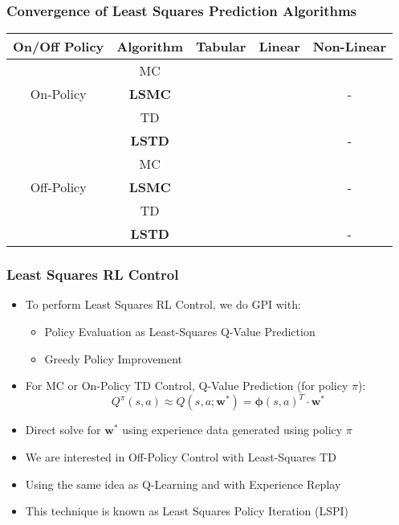 \documentclass[handout]{beamer}
\newcommand{\cmark}{\ding{51}}%
\newcommand{\xmark}{\ding{55}}%
\begin{document}
\begin{frame}
\frametitle{Convergence of Least Squares Prediction Algorithms}
\pause
\begin{center}
      \begin{tabular}{ccccc}
      \hline
      On/Off Policy & Algorithm & Tabular & Linear & Non-Linear \\ \hline
      \multirow{3}{*}{On-Policy} & MC & \cmark & \cmark & \cmark \\
      & {\bf LSMC} & \cmark & \cmark & - \\
      & TD & \cmark & \cmark & \xmark \\ 
      & {\bf LSTD} & \cmark & \cmark & - \\ \hline
      \multirow{3}{*}{Off-Policy} & MC & \cmark & \cmark & \cmark \\
      & {\bf LSMC} & \cmark & \xmark & - \\
      & TD & \cmark & \xmark & \xmark \\
      & {\bf LSTD} & \cmark & \xmark & - \\ \hline
      \end{tabular}
\end{center}      
\end{frame}

\begin{frame}
\frametitle{Least Squares RL Control}
\pause
\begin{itemize}[<+->]
\item To perform Least Squares RL Control, we do GPI with:
\begin{itemize}[<+->]
\item Policy Evaluation as Least-Squares Q-Value Prediction
\item Greedy Policy Improvement
\end{itemize}
\item For MC or On-Policy TD Control, Q-Value Prediction (for policy $\pi$):
$$Q^{\pi}(s,a) \approx Q(s,a;\bm{w}^*) = \bm{\phi}(s,a)^T \cdot \bm{w}^*$$
\item Direct solve for $\bm{w}^*$ using experience data generated using policy $\pi$
\item We are interested in Off-Policy Control with Least-Squares TD
\item Using the same idea as Q-Learning and with Experience Replay
\item This technique is known as Least Squares Policy Iteration (LSPI)
\end{itemize}
\end{frame}
\end{document}
